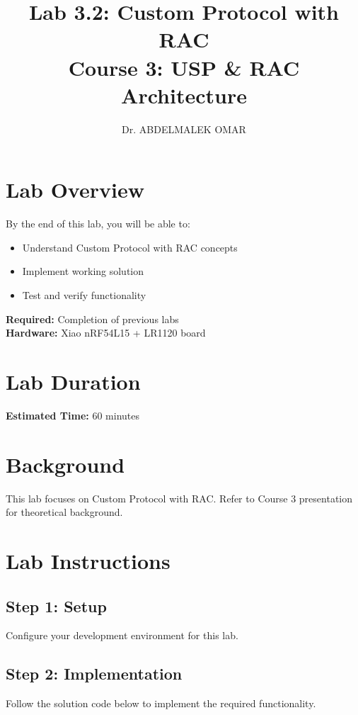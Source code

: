 \documentclass[11pt,a4paper]{article}
\title{\textbf{Lab 3.2: Custom Protocol with RAC}\\
\large Course 3: USP & RAC Architecture}
\author{Dr. ABDELMALEK OMAR}
\date{}
\begin{document}
\maketitle
\thispagestyle{fancy}

\section{Lab Overview}

\begin{objectivebox}
By the end of this lab, you will be able to:
\begin{itemize}
    \item Understand Custom Protocol with RAC concepts
    \item Implement working solution
    \item Test and verify functionality
\end{itemize}
\end{objectivebox}

\begin{prereqbox}
\textbf{Required:} Completion of previous labs\\
\textbf{Hardware:} Xiao nRF54L15 + LR1120 board
\end{prereqbox}

\section{Lab Duration}
\textbf{Estimated Time:} 60 minutes

\section{Background}

This lab focuses on Custom Protocol with RAC. Refer to Course 3 presentation for theoretical background.

\section{Lab Instructions}

\subsection{Step 1: Setup}
Configure your development environment for this lab.

\subsection{Step 2: Implementation}
Follow the solution code below to implement the required functionality.
\end{document}
